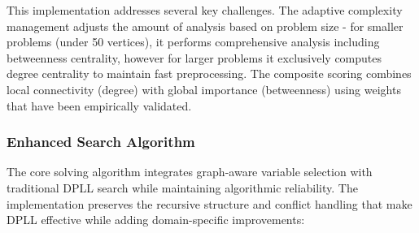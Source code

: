 This implementation addresses several key challenges. The adaptive complexity management adjusts the amount of analysis based on problem size - for smaller problems (under 50 vertices), it performs comprehensive analysis including betweenness centrality, however for larger problems it exclusively computes degree centrality to maintain fast preprocessing. The composite scoring combines local connectivity (degree) with global importance (betweenness) using weights that have been empirically validated.

\subsubsection{Enhanced Search Algorithm}

The core solving algorithm integrates graph-aware variable selection with traditional DPLL search while maintaining algorithmic reliability. The implementation preserves the recursive structure and conflict handling that make DPLL effective while adding domain-specific improvements:


